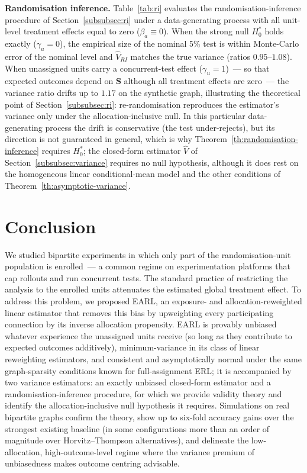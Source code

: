 \documentclass[sigconf]{acmart}
\begin{document}
\textbf{Randomisation inference.} Table~\ref{tab:ri} evaluates the randomisation-inference procedure of Section~\ref{subsubsec:ri} under a data-generating process with all unit-level treatment effects equal to zero ($\beta_a\equiv 0$). When the strong null $H_0^*$ holds exactly ($\gamma_u=0$), the empirical size of the nominal 5\% test is within Monte-Carlo error of the nominal level and $\hat V_{RI}$ matches the true variance (ratios $0.95$--$1.08$). When unassigned units carry a concurrent-test effect ($\gamma_u=1$)~--- so that expected outcomes depend on $\mathbf S$ although all treatment effects are zero~--- the variance ratio drifts up to $1.17$ on the synthetic graph, illustrating the theoretical point of Section~\ref{subsubsec:ri}: re-randomisation reproduces the estimator's variance only under the allocation-inclusive null. In this particular data-generating process the drift is conservative (the test under-rejects), but its direction is not guaranteed in general, which is why Theorem~\ref{th:randomisation-inference} requires $H_0^*$; the closed-form estimator $\hat V$ of Section~\ref{subsubsec:variance} requires no null hypothesis, although it does rest on the homogeneous linear conditional-mean model and the other conditions of Theorem~\ref{th:asymptotic-variance}.

\section{Conclusion}\label{sec:conclusion}

We studied bipartite experiments in which only part of the randomisation-unit population is enrolled~--- a common regime on experimentation platforms that cap rollouts and run concurrent tests. The standard practice of restricting the analysis to the enrolled units attenuates the estimated global treatment effect. To address this problem, we proposed EARL, an exposure- and allocation-reweighted linear estimator that removes this bias by upweighting every participating connection by its inverse allocation propensity. EARL is provably unbiased whatever experience the unassigned units receive (so long as they contribute to expected outcomes additively), minimum-variance in its class of linear reweighting estimators, and consistent and asymptotically normal under the same graph-sparsity conditions known for full-assignment ERL; it is accompanied by two variance estimators: an exactly unbiased closed-form estimator and a randomisation-inference procedure, for which we provide validity theory and identify the allocation-inclusive null hypothesis it requires. Simulations on real bipartite graphs confirm the theory, show up to six-fold accuracy gains over the strongest existing baseline (in some configurations more than an order of magnitude over Horvitz--Thompson alternatives), and delineate the low-allocation, high-outcome-level regime where the variance premium of unbiasedness makes outcome centring advisable.
\end{document}
